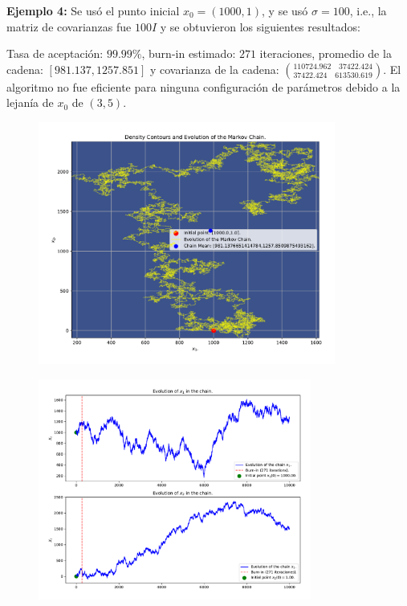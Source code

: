 \textbf{Ejemplo 4:} Se usó el punto inicial $x_0=(1000,1)$, y se usó $\sigma = 100$, i.e., la matriz de covarianzas fue $100 I$ y se obtuvieron los siguientes resultados:

Tasa de aceptación: $99.99\%$, burn-in estimado: $271$ iteraciones, promedio de la cadena: $[981.137, 1257.851]$ y covarianza de la cadena: $\binom{110724.962\quad37422.424}{37422.424\quad613530.619}$. El algoritmo no fue eficiente para ninguna configuración de parámetros debido a la lejanía de $x_0$ de $(3,5)$.
\begin{figure}[h!]
	\centering
	\includegraphics[width=0.87\textwidth]{IMAGENES/ex3/contour_example4.pdf}
\end{figure}

\begin{figure}[h!]
	\centering
	\includegraphics[width=0.8\textwidth]{IMAGENES/ex3/evolution_example4.pdf}
\end{figure}

